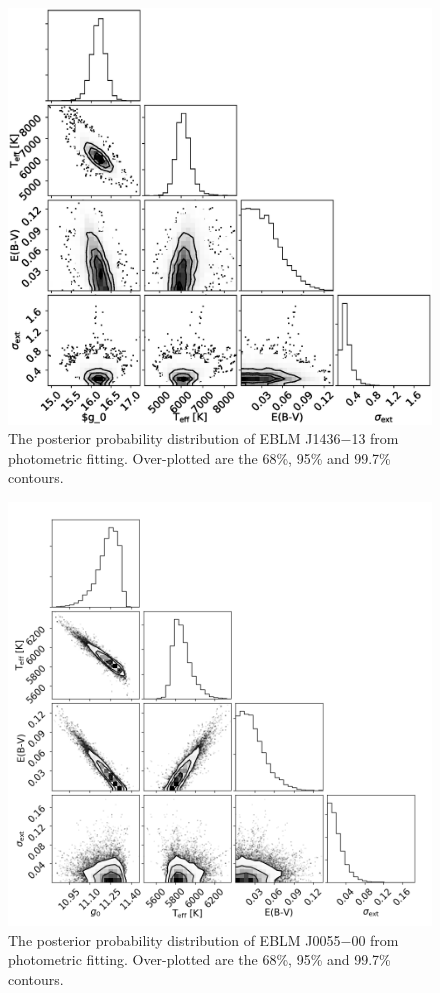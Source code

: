 \begin{figure}
    \centering
    \includegraphics[scale=0.5]{Appendix/SED_fits/J1436-13.eps}
    \caption{The posterior probability distribution of EBLM J1436$-$13 from photometric fitting. Over-plotted are the 68\%, 95\% and 99.7\% contours.}
    \label{methods:fig:SED_J1436-13}
\end{figure}

\begin{figure}
    \centering
    \includegraphics[scale=0.5]{Appendix/SED_fits/J0055-00.png}
    \caption{The posterior probability distribution of EBLM J0055$-$00 from photometric fitting. Over-plotted are the 68\%, 95\% and 99.7\% contours.}
    \label{methods:fig:SED_J0055-00}
\end{figure}

